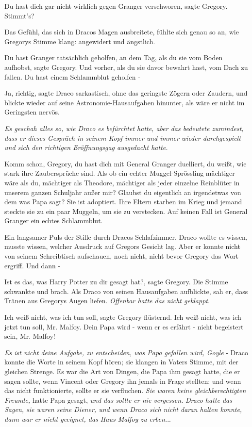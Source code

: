 \glqq{}Du hast dich gar nicht wirklich gegen Granger verschworen\grqq{}, sagte
Gregory. \glqq{}Stimmt's?\grqq{}

Das Gefühl, das sich in Dracos Magen ausbreitete, fühlte sich genau so an, wie
Gregorys Stimme klang: angewidert und ängstlich.

\glqq{}Du hast Granger tatsächlich geholfen, an dem Tag, als du sie vom Boden
aufhobst\grqq{}, sagte Gregory. \glqq{}Und vorher, als du sie davor bewahrt hast,
vom Dach zu fallen. Du hast einem Schlammblut geholfen -\grqq{}

\glqq{}Ja, richtig\grqq{}, sagte Draco sarkastisch, ohne das geringste Zögern
oder Zaudern, und blickte wieder auf seine Astronomie-Hausaufgaben hinunter, als
wäre er nicht im Geringsten nervös.

\emph{Es geschah alles so, wie Draco es befürchtet hatte, aber das bedeutete
zumindest, dass er dieses Gespräch in seinem Kopf immer und immer wieder
durchgespielt und sich den richtigen Eröffnungsgag ausgedacht hatte.}

\glqq{}Komm schon, Gregory, du hast dich mit General Granger duelliert, du weißt,
wie stark ihre Zaubersprüche sind. Als ob ein echter Muggel-Sprössling mächtiger
wäre als du, mächtiger als Theodore, mächtiger als jeder einzelne Reinblüter in
unserem ganzen Schuljahr außer mir? Glaubst du eigentlich an irgendetwas von dem
was Papa sagt? Sie ist adoptiert. Ihre Eltern starben im Krieg und jemand
steckte sie zu ein paar Muggeln, um sie zu verstecken. Auf keinen Fall ist
General Granger ein echtes Schlammblut.\grqq{}

Ein langsamer Puls der Stille durch Dracos Schlafzimmer. Draco wollte es wissen,
musste wissen, welcher Ausdruck auf Gregors Gesicht lag. Aber er konnte nicht
von seinem Schreibtisch aufschauen, noch nicht, nicht bevor Gregory das Wort
ergriff. Und dann -

\glqq{}Ist es das, was Harry Potter zu dir gesagt hat?\grqq{}, sagte Gregory. Die
Stimme schwankte und brach. Als Draco von seinen Hausaufgaben aufblickte, sah
er, dass Tränen aus Gregorys Augen liefen. \emph{Offenbar hatte das nicht
geklappt}.

\glqq{}Ich weiß nicht, was ich tun soll\grqq{}, sagte Gregory flüsternd. \glqq{}
Ich weiß nicht, was ich jetzt tun soll, Mr. Malfoy. Dein Papa wird - wenn er es
erfährt - nicht begeistert sein, Mr. Malfoy!\grqq{}

\emph{Es ist nicht deine Aufgabe, zu entscheiden, was Papa gefallen wird,
Goyle} - Draco konnte die Worte in seinem Kopf hören; sie klangen in Vaters
Stimme, mit der gleichen Strenge. Es war die Art von Dingen, die Papa ihm
gesagt hatte, die er sagen sollte, wenn Vincent oder Gregory ihn jemals in Frage
stellten; und wenn das nicht funktionierte, sollte er sie verfluchen. \emph{Sie
waren keine gleichberechtigten Freunde,} hatte Papa gesagt, \emph{und das
sollte er nie vergessen.} \emph{Draco hatte das Sagen, sie waren seine Diener,
und wenn Draco sich nicht daran halten konnte, dann war er nicht geeignet, das
Haus Malfoy zu erben.}..

